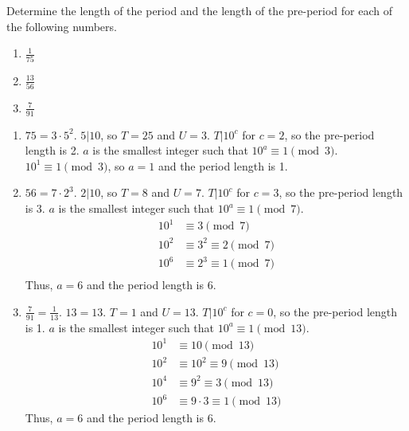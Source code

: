 \documentclass{article}
\begin{document}
\begin{problem}{}{}
    Determine the length of the period and the length of the pre-period for each of the following numbers.
    \begin{enumerate}[label=\textbf{\arabic*}.]
        \item $\frac{1}{75}$
        \item $\frac{13}{56}$
        \item $\frac{7}{91}$
    \end{enumerate}
\end{problem}
\begin{solution}{}{}
    \begin{enumerate}[label=\textbf{\arabic*}.]
        \item $75=3\cdot5^2$. $5|10$, so $T=25$ and $U=3$. $T|10^c$ for $c=2$, so the pre-period length is 2. $a$ is the smallest integer such that $10^a\equiv1\pmod{3}$. $10^1\equiv1\pmod{3}$, so $a=1$ and the period length is 1. 
        \item $56=7\cdot2^3$. $2|10$, so $T=8$ and $U=7$. $T|10^c$ for $c=3$, so the pre-period length is 3. $a$ is the smallest integer such that $10^a\equiv1\pmod{7}$. 
        \begin{align*}
            10^1 &\equiv3\pmod{7} \\
            10^2 &\equiv3^2\equiv2\pmod{7} \\
            10^6 &\equiv2^3\equiv1\pmod{7} \\
        \end{align*}
        Thus, $a=6$ and the period length is 6.
        \item $\frac{7}{91} = \frac{1}{13}$. $13=13$. $T=1$ and $U=13$. $T|10^c$ for $c=0$, so the pre-period length is 1. $a$ is the smallest integer such that $10^a\equiv1\pmod{13}$.
        \begin{align*}
            10^1 &\equiv10\pmod{13} \\
            10^2 &\equiv10^2\equiv9\pmod{13} \\
            10^4 &\equiv9^2\equiv3\pmod{13} \\
            10^6 &\equiv9\cdot3\equiv1\pmod{13}
        \end{align*}
        Thus, $a=6$ and the period length is 6.
    \end{enumerate}
\end{solution}
\end{document}
